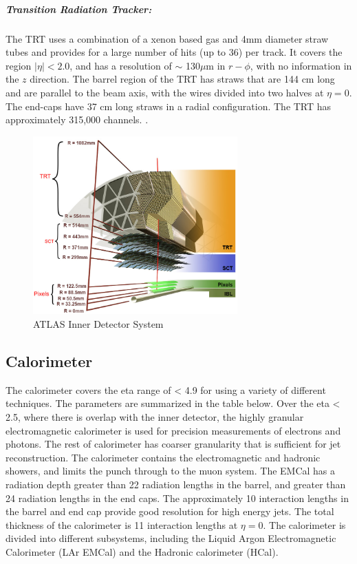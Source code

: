\subparagraph{Transition Radiation Tracker:} The TRT uses a combination of a xenon based gas and 4mm diameter straw tubes and provides for a large number of hits (up to 36) per track. It covers the region $|\eta| <  2.0$, and has a resolution of $\sim$ 130$\mu$m in $r-\phi$, with no information in the $z$ direction. The barrel region of the TRT has straws that are 144 cm long and are parallel to the beam axis, with the wires divided into two halves at $\eta = 0$. The end-caps have 37 cm long straws in a radial configuration. The TRT has approximately 315,000 channels. \cite{Aad:2008zzm}.


\begin{figure}[ht]
	\centering
        \includegraphics[width=0.7\textwidth]{figures/setup/inner_det.png}
          \caption{ATLAS Inner Detector System}
          \label{fig:inner_det}
\end{figure}

\subsection{Calorimeter}
The calorimeter covers the eta range of < 4.9 for using a variety of different techniques. The parameters are summarized in the table below. Over the eta < 2.5, where there is overlap with the inner detector, the highly granular electromagnetic calorimeter is used for precision measurements of electrons and photons. The rest of calorimeter has coarser granularity that is sufficient for jet reconstruction. The calorimeter contains the electromagnetic and hadronic showers, and limits the punch through to the muon system. The EMCal has a radiation depth greater than 22 radiation lengths in the barrel, and greater than 24 radiation lengths in the end caps. The approximately 10 interaction lengths in the barrel and end cap provide good resolution for high energy jets. The total thickness of the calorimeter is 11 interaction lengths at $\eta = 0$. The calorimeter is divided into different subsystems, including the Liquid Argon Electromagnetic Calorimeter (LAr EMCal) and the Hadronic calorimeter (HCal).

